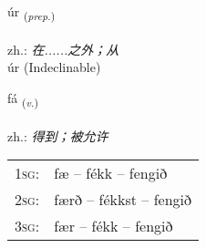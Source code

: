 \documentclass[frontgrid, backgrid]{flacards}\usepackage[]{graphicx}\usepackage[]{xcolor}
\begin{document}
\renewcommand{\blhead}{\vskip5pt {\small\bfseries\footnotesize Forsetning | 介词 }}
\renewcommand{\bcfoot}{\vskip5pt \hspace{2pt}{\small\bfseries\footnotesize 1K}}


{úr \small{\textsubscript{(\textit{prep.})}} \\[1ex]
\textphonetic{[uːr]} \\
zh.: \emph{在......之外；从} \\  [2ex]
úr (Indeclinable)}

\renewcommand{\flhead}{\vskip5pt \fboxsep=0pt {\small\bfseries\footnotesize Sagnorð | 动词}}
\renewcommand{\fcfoot}{\vskip5pt \fboxsep=0pt \hspace{2pt}{\small\bfseries\footnotesize 1K}}

\renewcommand{\blhead}{\vskip5pt {\small\bfseries\footnotesize Sagnorð | 动词 }}
\renewcommand{\bcfoot}{\vskip5pt \hspace{2pt}{\small\bfseries\footnotesize 1K}}


{fá \small{\textsubscript{(\textit{v.})}} \\[1ex] %
\textphonetic{[fauː]} \\
zh.: \emph{得到；被允许} \\  [2ex]
\renewcommand*{\arraystretch}{0.8}
\begin{tabular}{p{1cm}l}
\textsc{1sg}: & fæ -- fékk -- fengið \\ 
\textsc{2sg}: & færð -- fékkst -- fengið \\ 
\textsc{3sg}: & fær -- fékk -- fengið \\ 
\end{tabular}
}


\renewcommand{\flhead}{\vskip5pt \fboxsep=0pt {\small\bfseries\footnotesize Forsetning | 介词}}
\renewcommand{\fcfoot}{\vskip5pt \fboxsep=0pt \hspace{2pt}{\small\bfseries\footnotesize 1K}}

\renewcommand{\blhead}{\vskip5pt {\small\bfseries\footnotesize Forsetning | 介词 }}
\renewcommand{\bcfoot}{\vskip5pt \hspace{2pt}{\small\bfseries\footnotesize 1K}}
\end{document}
